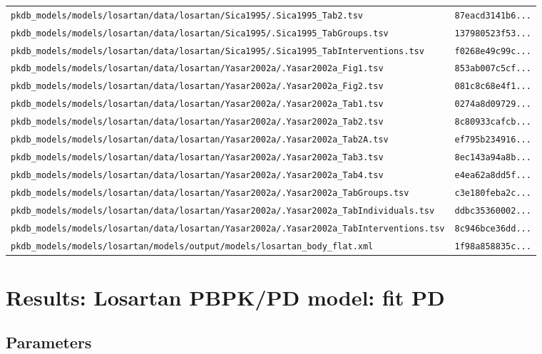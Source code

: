 \begin{longtable}{ll}
\texttt{pkdb\_models/models/losartan/data/losartan/Sica1995/.Sica1995\_Tab2.tsv} & \texttt{87eacd3141b6...} \\
\texttt{pkdb\_models/models/losartan/data/losartan/Sica1995/.Sica1995\_TabGroups.tsv} & \texttt{137980523f53...} \\
\texttt{pkdb\_models/models/losartan/data/losartan/Sica1995/.Sica1995\_TabInterventions.tsv} & \texttt{f0268e49c99c...} \\
\texttt{pkdb\_models/models/losartan/data/losartan/Yasar2002a/.Yasar2002a\_Fig1.tsv} & \texttt{853ab007c5cf...} \\
\texttt{pkdb\_models/models/losartan/data/losartan/Yasar2002a/.Yasar2002a\_Fig2.tsv} & \texttt{081c8c68e4f1...} \\
\texttt{pkdb\_models/models/losartan/data/losartan/Yasar2002a/.Yasar2002a\_Tab1.tsv} & \texttt{0274a8d09729...} \\
\texttt{pkdb\_models/models/losartan/data/losartan/Yasar2002a/.Yasar2002a\_Tab2.tsv} & \texttt{8c80933cafcb...} \\
\texttt{pkdb\_models/models/losartan/data/losartan/Yasar2002a/.Yasar2002a\_Tab2A.tsv} & \texttt{ef795b234916...} \\
\texttt{pkdb\_models/models/losartan/data/losartan/Yasar2002a/.Yasar2002a\_Tab3.tsv} & \texttt{8ec143a94a8b...} \\
\texttt{pkdb\_models/models/losartan/data/losartan/Yasar2002a/.Yasar2002a\_Tab4.tsv} & \texttt{e4ea62a8dd5f...} \\
\texttt{pkdb\_models/models/losartan/data/losartan/Yasar2002a/.Yasar2002a\_TabGroups.tsv} & \texttt{c3e180feba2c...} \\
\texttt{pkdb\_models/models/losartan/data/losartan/Yasar2002a/.Yasar2002a\_TabIndividuals.tsv} & \texttt{ddbc35360002...} \\
\texttt{pkdb\_models/models/losartan/data/losartan/Yasar2002a/.Yasar2002a\_TabInterventions.tsv} & \texttt{8c946bce36dd...} \\
\texttt{pkdb\_models/models/losartan/models/output/models/losartan\_body\_flat.xml} & \texttt{1f98a858835c...} \\
\end{longtable}

\section{Results: Losartan PBPK/PD model: fit PD}

\subsection{Parameters}

